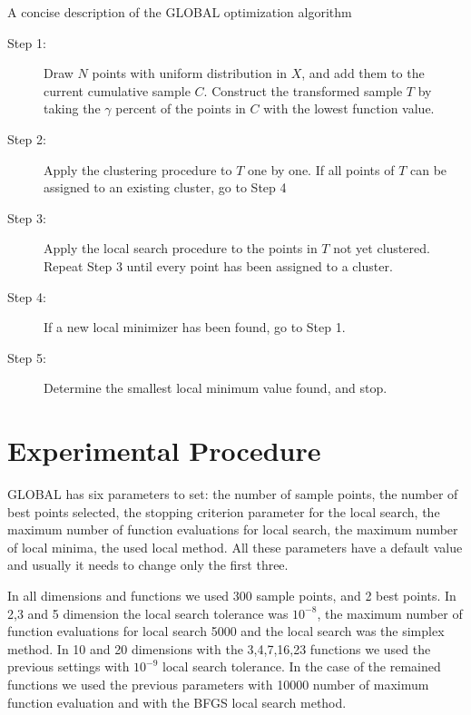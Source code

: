 \documentclass{sig-alternate}
\begin{document}
\begin{algorithm}

\caption{A concise description of the GLOBAL optimization algorithm}

\begin{description}
\item[Step 1:] Draw $N$ points with uniform distribution in $X$, and add them to the
current cumulative sample $C$. Construct the transformed sample $T$ by taking
the $\gamma$ percent of the points in $C$ with the lowest function value.

\item[Step 2:] Apply the clustering procedure to $T$ one by one. If all points of $T$ can be
assigned to an existing cluster, go to Step 4

\item[Step 3:] Apply the local search procedure to the points in $T$ not yet
clustered. Repeat Step 3 until every point has been assigned to a cluster.

\item[Step 4:]If a new local minimizer has been found, go to Step 1.

\item[Step 5:] Determine the smallest local minimum value found, and stop.
\end{description} \label{a1}
\end{algorithm}



\section{Experimental Procedure}

GLOBAL has six parameters to set: the number of sample points, the number of best points selected, the stopping criterion parameter for the local search, the maximum number of function evaluations for local search, the maximum number of local minima, the used local method. All these parameters have a default value and usually it needs to change only the first three.

In all dimensions and functions we used 300 sample points, and 2 best points. In 2,3 and 5 dimension the local search tolerance was $10^{-8}$, the maximum number of function evaluations for local search 5000 and the local search was the simplex method. In 10 and 20 dimensions with the 3,4,7,16,23 functions we used the previous settings with $10^{-9}$ local search tolerance. In the case of the remained functions we used the previous parameters with 10000 number of maximum function evaluation and with the BFGS local search method.
\end{document}

